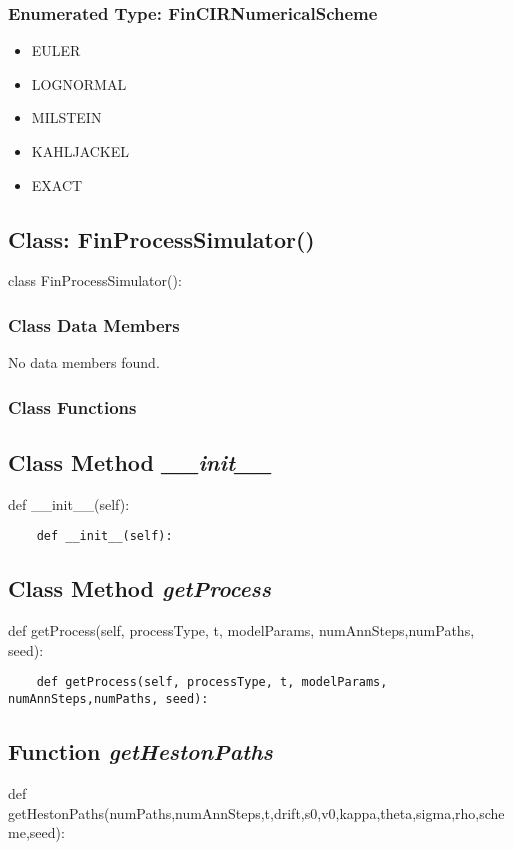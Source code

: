 \documentclass[twoside,11pt]{book}
\begin{document}
\subsubsection{Enumerated Type: FinCIRNumericalScheme}
\begin{itemize}
\item{EULER}
\item{LOGNORMAL}
\item{MILSTEIN}
\item{KAHLJACKEL}
\item{EXACT}
\end{itemize}

\subsection{Class: FinProcessSimulator()}
class FinProcessSimulator():

\subsubsection{Class Data Members}
No data members found.

\subsubsection{Class Functions}

\subsection{Class Method {\it \_\_init\_\_}}
def \_\_init\_\_(self):

\begin{lstlisting}
    def __init__(self):
\end{lstlisting}

\subsection{Class Method {\it getProcess}}
def getProcess(self, processType, t, modelParams, numAnnSteps,numPaths, seed):

\begin{lstlisting}
    def getProcess(self, processType, t, modelParams, numAnnSteps,numPaths, seed):
\end{lstlisting}

\subsection{Function {\it getHestonPaths}}
def getHestonPaths(numPaths,numAnnSteps,t,drift,s0,v0,kappa,theta,sigma,rho,scheme,seed):
\end{document}
